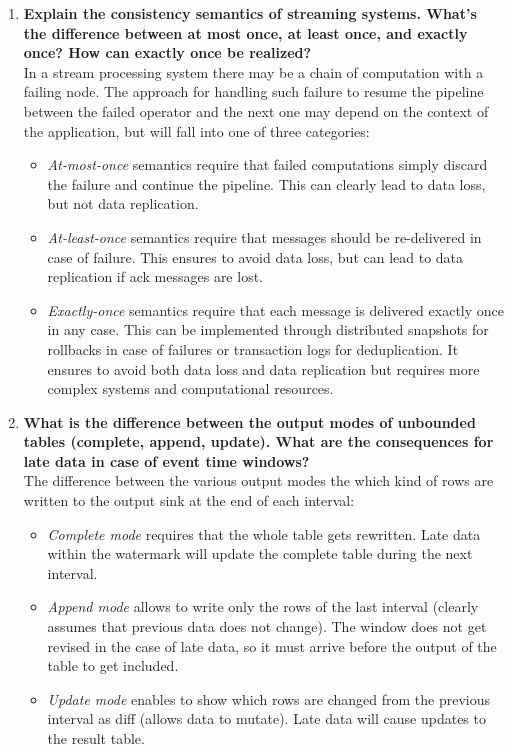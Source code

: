 \documentclass{article}
\begin{document}
\begin{enumerate}
    \item \textbf{Explain the consistency semantics of streaming systems. What's the difference between at most once, at least once, and exactly once? How can exactly once be realized?}
    \\ \noindent
    In a stream processing system there may be a chain of computation with a failing node. The approach for handling such failure to resume the pipeline between the failed operator and the next one may depend on the context of the application, but will fall into one of three categories:
    \begin{itemize}
        \item \textit{At-most-once} semantics require that failed computations simply discard the failure and continue the pipeline. This can clearly lead to data loss, but not data replication.
        \item \textit{At-least-once} semantics require that messages should be re-delivered in case of failure. This ensures to avoid data loss, but can lead to data replication if ack messages are lost.
        \item \textit{Exactly-once} semantics require that each message is delivered exactly once in any case. This can be implemented through distributed snapshots for rollbacks in case of failures or transaction logs for deduplication. It ensures to avoid both data loss and data replication but requires more complex systems and computational resources.
    \end{itemize}

    \item \textbf{What is the difference between the output modes of unbounded tables (complete, append, update). What are the consequences for late data in case of event time windows?}
    \\ \noindent
    The difference between the various output modes the which kind of rows are written to the output sink at the end of each interval:
    \begin{itemize}
        \item \textit{Complete mode} requires that the whole table gets rewritten. Late data within the watermark will update the complete table during the next interval.
        \item \textit{Append mode} allows to write only the rows of the last interval (clearly assumes that previous data does not change). The window does not get revised in the case of late data, so it must arrive before the output of the table to get included.
        \item \textit{Update mode} enables to show which rows are changed from the previous interval as diff (allows data to mutate). Late data will cause updates to the result table.
    \end{itemize}
    

\end{enumerate}
\end{document}
